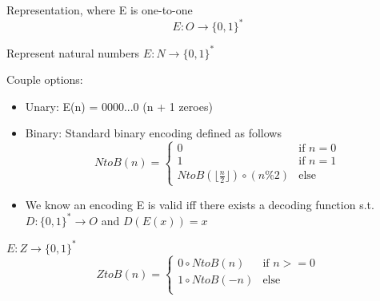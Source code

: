 \begin{definition}
    Representation, where E is one-to-one
    \[
    E: O \rightarrow \{ 0,1 \}^*
    \] 
\end{definition}

\begin{example}
    Represent natural numbers $E: N \rightarrow \{ 0, 1\}^*$

    Couple options:
    \begin{itemize}
        \item Unary: E(n) = 0000...0 (n + 1 zeroes)
        \item Binary: Standard binary encoding defined as follows
        \begin{equation}
            NtoB(n) =
            \begin{cases}
                0 & \text{if } n = 0\\
                1 & \text{if } n = 1\\
                NtoB(\lfloor \frac{n}{2} \rfloor)\circ(n \% 2) & \text{else}
            \end{cases}
        \end{equation}
        \item We know an encoding E is valid iff there exists a decoding function s.t. $D: \{0, 1\}^* \rightarrow O$ and $D(E(x)) = x$
    \end{itemize}
\end{example}

\begin{example}
    $E: Z \rightarrow \{0,1\}^*$
    \begin{equation}
        ZtoB(n) =
        \begin{cases}
            0 \circ NtoB(n) & \text{if } n >= 0\\
            1 \circ NtoB(-n) & \text{else}\\
        \end{cases}
    \end{equation}
\end{example}

